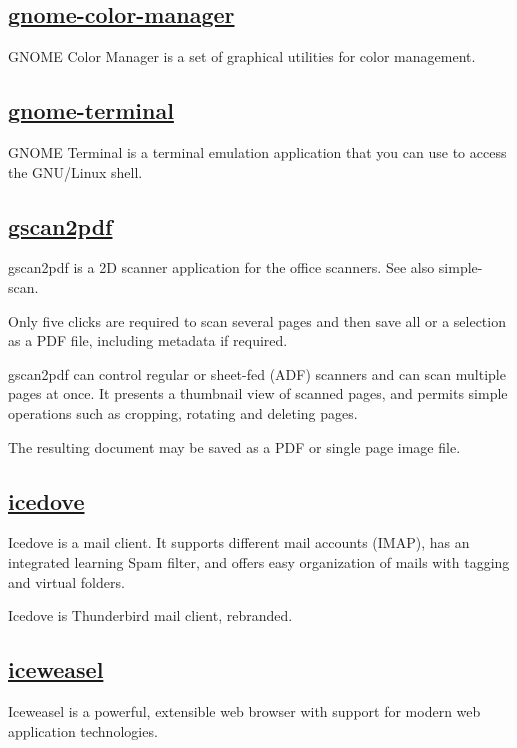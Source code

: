 \subsection{\href{https://git.gnome.org/browse/gnome-color-manager}{gnome-color-manager}}

 GNOME Color Manager is a set of graphical utilities for color
 management.

\subsection{\href{}{gnome-terminal}}

 GNOME Terminal is a terminal emulation application that you can use to
 access the GNU/Linux shell.

\subsection{\href{http://gscan2pdf.sourceforge.net/}{gscan2pdf}}

gscan2pdf is a 2D scanner application for the office scanners. See also
simple-scan.

 Only five clicks are required to scan several pages and then save all or a
 selection as a PDF file, including metadata if required.
 
 gscan2pdf can control regular or sheet-fed (ADF) scanners
 and can scan multiple pages at once.
 It presents a thumbnail view of scanned pages, and permits simple operations
 such as cropping, rotating and deleting pages.
 
 The resulting document may be saved as a PDF or
 single page image file.

\subsection{\href{http://www.mozilla.org/thunderbird/}{icedove}}

 Icedove is a mail client.
 It supports different mail accounts (IMAP), has an
 integrated learning Spam filter, and offers easy organization of mails with
 tagging and virtual folders.
 
 Icedove is Thunderbird mail client, rebranded.

\subsection{\href{https://www.mozilla.org/en-US/firefox/desktop/}{iceweasel}}

 Iceweasel is a powerful, extensible web browser
 with support for modern web application technologies.

